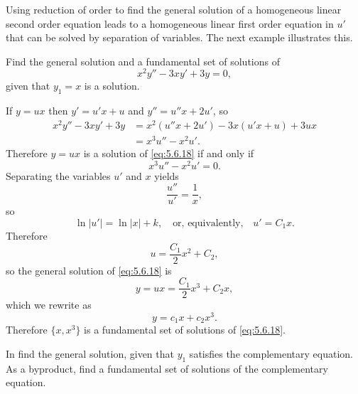Using reduction of order to  find the general solution of
a homogeneous linear second order  equation leads to a
homogeneous linear first  order  equation in $u'$ that can be solved
by separation of variables. The next example illustrates this.

\begin{example}\label{example:5.6.3}
 Find the general solution and a fundamental set  of solutions of
\begin{equation}  \label{eq:5.6.18}
x^2y''-3xy'+3y=0,
\end{equation}
 given that $y_1=x$ is a solution.
\end{example}

\begin{solution}
 If $y=ux$ then $y'=u'x+u$ and $y''=u''x+2u'$, so
\begin{align*}
x^2y''-3xy'+3y&=x^2(u''x+2u')-3x(u'x+u)+3ux\\
&=x^3u''-x^2u'.
\end{align*}
Therefore $y=ux$ is a solution of \eqref{eq:5.6.18} if and only if
\[
x^3u''-x^2u'=0.
\]
Separating the variables $u'$ and $x$ yields
\[
\frac{u''}{u'}=\frac{1}{x},
\]
so
\[
\ln|u'|=\ln|x|+k,\quad\text{or, equivalently,}\quad u'=C_1x.
\]
Therefore
\[
u=\frac{C_1}{2}x^2+C_2,
\]
so the general solution of \eqref{eq:5.6.18} is
\[
y=ux=\frac{C_1}{2}x^3+C_2x,
\]
which we rewrite as
\[
y=c_1x+c_2x^3.
\]
Therefore $\{x,x^3\}$ is  a fundamental set of solutions of
\eqref{eq:5.6.18}.
\end{solution}

\exercises
In  find the general solution,
given that $y_1$ satisfies the complementary equation. As a byproduct,
find a fundamental set of solutions of the complementary equation.

